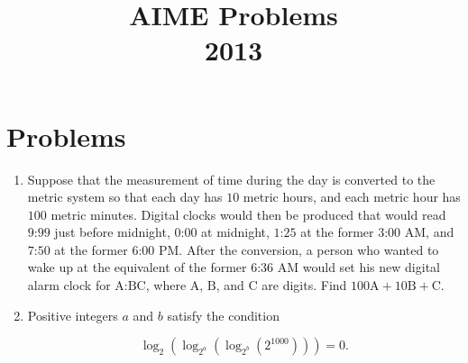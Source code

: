 \documentclass{article}
\title{AIME Problems \\ 2013}
\date{}
\begin{document}
\maketitle\thispagestyle{fancy}\newpage\section*{Problems}\begin{enumerate}[label=\arabic*., itemsep=0.5em]\item Suppose that the measurement of time during the day is converted to the metric system so that each day has $10$ metric hours, and each metric hour has $100$ metric minutes. Digital clocks would then be produced that would read $\text{9:99}$ just before midnight, $\text{0:00}$ at midnight, $\text{1:25}$ at the former $\text{3:00}$ AM, and $\text{7:50}$ at the former $\text{6:00}$ PM. After the conversion, a person who wanted to wake up at the equivalent of the former $\text{6:36}$ AM would set his new digital alarm clock for $\text{A:BC}$, where $\text{A}$, $\text{B}$, and $\text{C}$ are digits. Find $100\text{A}+10\text{B}+\text{C}$.\par \vspace{0.5em}\item Positive integers $a$ and $b$ satisfy the condition

\begin{equation*}
\log_2(\log_{2^a}(\log_{2^b}(2^{1000}))) = 0.
\end{equation*}


\end{enumerate}
\end{document}
